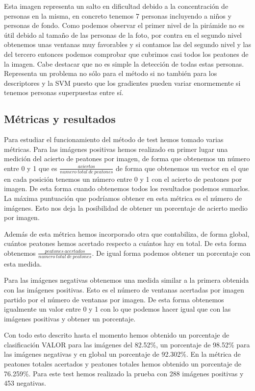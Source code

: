 \documentclass[a4paper,12pt]{article}
\begin{document}
Esta imagen representa un salto en dificultad debido a la concentración de personas en la misma, en concreto tenemos 7 personas incluyendo a niños y personas de fondo. Como podemos observar el primer nivel de la pirámide no es útil debido al tamaño de las personas de la foto, por contra en el segundo nivel obtenemos unas ventanas muy favorables y si contamos las del segundo nivel y las del tercero entonces podemos comprobar que cubrimos casi todos los peatones de la imagen. Cabe destacar que no es simple la detección de todas estas personas. Representa un problema no sólo para el método si no también para los descriptores y la SVM puesto que los gradientes pueden variar enormemente si tenemos personas superpuestas entre sí.

\subsection{Métricas y resultados}

Para estudiar el funcionamiento del método de test hemos tomado varias métricas. Para las imágenes positivas hemos realizado en primer lugar una medición del acierto de peatones por imagen, de forma que obtenemos un número entre 0 y 1 que es $\frac{aciertos}{numero \ total \ de \ peatones}$ de forma que obtenemos un vector en el que en cada posición tenemos un número entre 0 y 1 con el acierto de peatones por imagen. De esta forma cuando obtenemos todos los resultados podemos sumarlos. La máxima puntuación que podríamos obtener en esta métrica es el número de imágenes. Esto nos deja la posibilidad de obtener un porcentaje de acierto medio por imagen. 

Además de esta métrica hemos incorporado otra que contabiliza, de forma global, cuántos peatones hemos acertado respecto a cuántos hay en total. De esta forma obtenemos $\frac{peatones \ acertados}{numero \ total \ de \ peatones}$. De igual forma podemos obtener un porcentaje con esta medida.

Para las imágenes negativas obtenemos una medida similar a la primera obtenida con las imágenes positivas. Esto es el número de ventanas acertadas por imagen partido por el número de ventanas por imagen. De esta forma obtenemos igualmente un valor entre 0 y 1 con lo que podemos hacer igual que con las imágenes positivas y obtener un porcentaje. 

Con todo esto descrito hasta el momento hemos obtenido un porcentaje de clasificación VALOR para las imágenes del 82.52\%, un porcentaje de 98.52\% para las imágenes negativas y en global un porcentaje de 92.302\%. En la métrica de peatones totales acertados y peatones totales hemos obtenido un porcentaje de 76.259\%. Para este test hemos realizado la prueba con 288 imágenes positivas y 453 negativas. 
\end{document}

